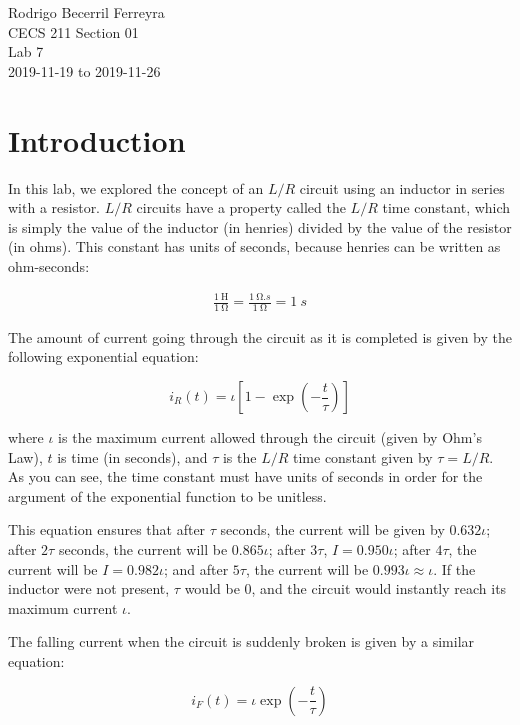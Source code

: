 \documentclass{article}
\begin{document}
\begin{flushright}
    \noindent
    Rodrigo Becerril Ferreyra\\
    CECS 211 Section 01\\
    Lab 7\\
    2019-11-19 to 2019-11-26
\end{flushright}

\section{Introduction} In this lab, we explored the concept of an \(L/R\) circuit using
an inductor in series with a resistor. \(L/R\) circuits have a
property called the \(L/R\) time constant, which is simply the
value of the inductor (in henries) divided by the value of
the resistor (in ohms). This constant has units of seconds,
because henries can be written as ohm-seconds:

\begin{align*}
    \frac{\SI{1}{\henry}}{\SI{1}{\ohm}} = \frac{\SI{1}{\ohm.s}}{\SI{1}{\ohm}} = \SI{1}{s}
\end{align*}

The amount of current going through the circuit as it is
completed is given by
the following exponential equation:

\begin{equation}
    i_R(t) = \iota\left[1-\exp\left(-\frac{t}{\tau}\right)\right]
\end{equation}

where \(\iota\) is the maximum current allowed through the
circuit (given by Ohm's Law), \(t\) is time (in seconds),
and \(\tau\) is the \(L/R\) time constant given by
\(\tau = L/R\). As you can see, the time constant must
have units of seconds in order for the argument of the
exponential function to be unitless.

This equation ensures that after \(\tau\) seconds, the current
will be given by \(0.632\iota\); after \(2\tau\) seconds, the
current will be \(0.865\iota\); after \(3\tau\),
\(I = 0.950\iota\); after \(4\tau\), the current will be
\(I = 0.982\iota\); and after \(5\tau\),
the current will be \(0.993\iota \approx \iota\). If the inductor
were not present, \(\tau\) would be \num{0}, and the
circuit would instantly reach its maximum current \(\iota\).

The falling current when the circuit is suddenly broken is
given by a similar equation:

\begin{equation}
    i_F(t) = \iota \exp\left( -\frac{t}{\tau} \right)
\end{equation}
\end{document}
